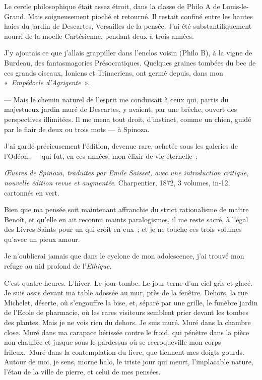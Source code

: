 Le cercle philosophique était assez étroit, dans la classe de Philo A de
Louis-le-Grand. Mais soigneusement pioché et retourné. Il restait
confiné entre les hautes haies du jardin de Descartes, Versailles de la
pensée. J'ai été substantifiquement nourri de la moelle Cartésienne,
pendant deux à trois années.

J'y ajoutais ce que j'allais grappiller dans l'enclos voisin (Philo B),
à la vigne de Burdeau, des fantasmagories Présocratiques. Quelques
graines tombées du bec de ces grands oiseaux, Ioniens et Trinacriens,
ont germé depuis, dans mon «~\emph{Empédocle d'Agrigente}~».

--- Mais le chemin naturel de l'esprit me conduisait à ceux qui, partis
du majestueux jardin muré de Descartes, y avaient, par une brèche,
ouvert des perspectives illimitées. Il me mena tout droit, d'instinct,
comme un chien, guidé par le flair de deux ou trois mots --- à Spinoza.

J'ai gardé précieusement l'édition, devenue rare, achetée sous les
galeries de l'Odéon, --- qui fut, en ces années, mon élixir de vie
éternelle~:

\emph{\OE uvres de Spinoza, traduites par Emile Saisset, avec une
introduction critique, nouvelle édition revue et augmentée}.
Charpentier, 1872, 3 volumes, in-12, cartonnés en vert.

Bien que ma pensée soit maintenant affranchie du strict rationalisme de
maître Benoît, et qu'elle en ait reconnu maints paralogismes, il me
reste sacré, à l'égal des Livres Saints pour un qui croit en eux~; et je
ne touche ces trois volumes qu'avec un pieux amour.

Je n'oublierai jamais que dans le cyclone de mon adolescence, j'ai
trouvé mon refuge au nid profond de l'\emph{Ethique}.

C'est quatre heures. L'hiver. Le jour tombe. Le jour terne d'un ciel
gris et glacé. Je suis assis devant ma table adossée au mur, près de la
fenêtre. Dehors, la rue Michelet, déserte, où s'engouffre la bise, et,
séparé par une grille, le funèbre jardin de l'Ecole de pharmacie, où les
rares visiteurs semblent prier devant les tombes des plantes.
Mais je ne vois rien du dehors. Je suis muré. Muré
dans la chambre close. Muré dans ma carapace hérissée contre le froid,
qui pénètre dans la pièce non chauffée et jusque sous le pardessus où se
recroqueville mon corps frileux.\est\ Muré dans la contemplation  du livre,
que tiennent mes doigts gourds. Autour de moi, je sens, morne halo, le
triste jour qui meurt, l'implacable nature, l'étau de la ville de
pierre, et celui de mes pensées.

